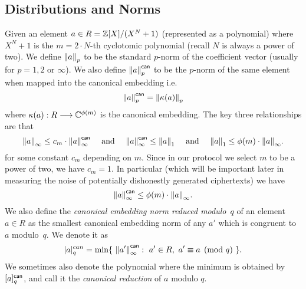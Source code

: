 \subsection{Distributions and Norms}
Given an element $a \in R = {\mathbb{Z}}[X]/(X^{N}+1)$ (represented as a polynomial)
where $X^N+1$ is the $m=2 \cdot N$-th cyclotomic polynomial
(recall $N$ is always a power of two).
We define ${\Vert a \Vert}_p$ to be the standard $p$-norm
of the coefficient vector (usually for $p=1, 2$ or $\infty$).
We also define ${\Vert a \Vert}_p^{\mathsf{can}}$ to be the $p$-norm
of the same element when mapped into the canonical embedding
i.e.
\[  {\Vert a \Vert}_p^{\mathsf{can}} = {\Vert \kappa(a) \Vert}_p \]
where $\kappa(a): R \longrightarrow \mathbb{C}^{\phi(m)}$ is the
canonical embedding.
The key three relationships are that
\[ {\Vert a \Vert}_\infty \le c_m \cdot {\Vert a \Vert}_\infty^{\mathsf{can}} \quad
  \mbox{  and  } \quad
  {\Vert a \Vert}_\infty^{\mathsf{can}} \le {\Vert a \Vert}_1  \quad
  \mbox{  and  } \quad
  {\Vert a \Vert}_1 \le \phi(m) \cdot {\Vert a \Vert}_\infty.
\]
for some constant $c_m$ depending on $m$.
Since in our protocol we select $m$ to be a power of two, we have $c_m=1$.
In particular (which will be important later in measuring the
noise of potentially dishonestly generated ciphertexts) we have
\[ {\Vert a \Vert}_{\infty}^{\mathsf{can}} \le \phi(m) \cdot {\Vert a \Vert}_{\infty}. \]
We also define the \emph{canonical embedding norm reduced modulo~$q$}
of an element $a\in R$ as the smallest canonical embedding norm of any
$a'$ which is congruent to $a$ modulo~$q$. We denote it as
\[
  |a|_q^{can} = \min
  \{~{\Vert a' \Vert}_\infty^{\mathsf{can}} :~ a'\in R,~ a' \equiv a \pmod{q}~\}.
\]
We sometimes also denote the polynomial where the minimum is obtained
by $[a]_q^{\mathsf{can}}$, and call it the {\em canonical reduction} of
$a$ modulo $q$.

